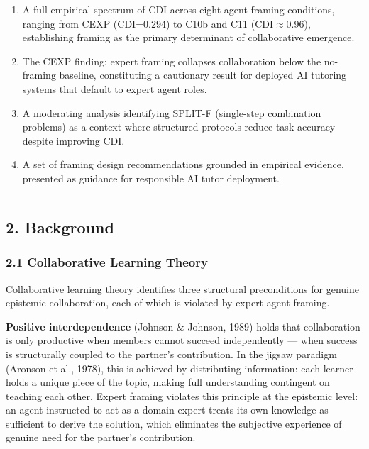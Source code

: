 \documentclass[
  11pt,
]{article}
\providecommand{\tightlist}{%
  \setlength{\itemsep}{0pt}\setlength{\parskip}{0pt}}
\begin{document}
\begin{enumerate}
\def\labelenumi{\arabic{enumi}.}
\tightlist
\item
  A full empirical spectrum of CDI across eight agent framing conditions,
  ranging from CEXP (CDI=0.294) to C10b and C11 (CDI$\approx$0.96),
  establishing framing as the primary determinant of collaborative emergence.
\item
  The CEXP finding: expert framing collapses collaboration below the
  no-framing baseline, constituting a cautionary result for deployed
  AI tutoring systems that default to expert agent roles.
\item
  A moderating analysis identifying SPLIT-F (single-step combination
  problems) as a context where structured protocols reduce task accuracy
  despite improving CDI.
\item
  A set of framing design recommendations grounded in empirical evidence,
  presented as guidance for responsible AI tutor deployment.
\end{enumerate}

\begin{center}\rule{0.5\linewidth}{0.5pt}\end{center}

\subsection{2. Background}\label{background}

\subsubsection{2.1 Collaborative Learning
Theory}\label{collaborative-learning-theory}

Collaborative learning theory identifies three structural preconditions for genuine epistemic collaboration, each of which is violated by expert agent framing.

\textbf{Positive interdependence} (Johnson \& Johnson, 1989) holds that collaboration is only productive when members cannot succeed independently --- when success is structurally coupled to the partner's contribution. In the jigsaw paradigm (Aronson et al., 1978), this is achieved by distributing information: each learner holds a unique piece of the topic, making full understanding contingent on teaching each other. Expert framing violates this principle at the epistemic level: an agent instructed to act as a domain expert treats its own knowledge as sufficient to derive the solution, which eliminates the subjective experience of genuine need for the partner's contribution.
\end{document}
